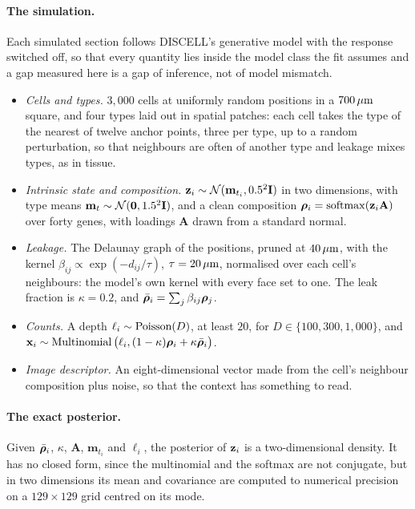 \paragraph{The simulation.}
Each simulated section follows DISCELL's generative model with the response switched off, so that every quantity lies inside the model class the fit assumes and a gap measured here is a gap of inference, not of model mismatch.
\begin{itemize}
\item \emph{Cells and types.} $3{,}000$ cells at uniformly random positions in a $700\,\mu\text{m}$ square, and four types laid out in spatial patches: each cell takes the type of the nearest of twelve anchor points, three per type, up to a random perturbation, so that neighbours are often of another type and leakage mixes types, as in tissue.
\item \emph{Intrinsic state and composition.} $\mathbf{z}_i \sim \mathcal{N}(\mathbf{m}_{t_i}, 0.5^2\mathbf{I})$ in two dimensions, with type means $\mathbf{m}_t \sim \mathcal{N}(\mathbf{0}, 1.5^2\mathbf{I})$, and a clean composition $\boldsymbol{\rho}_i = \operatorname{softmax}(\mathbf{z}_i\mathbf{A})$ over forty genes, with loadings $\mathbf{A}$ drawn from a standard normal.
\item \emph{Leakage.} The Delaunay graph of the positions, pruned at $40\,\mu\text{m}$, with the kernel $\beta_{ij} \propto \exp(-d_{ij}/\tau)$, $\tau = 20\,\mu\text{m}$, normalised over each cell's neighbours: the model's own kernel with every face set to one. The leak fraction is $\kappa = 0.2$, and $\bar{\boldsymbol{\rho}}_i = \sum_j \beta_{ij}\boldsymbol{\rho}_j$.
\item \emph{Counts.} A depth $\ell_i \sim \operatorname{Poisson}(D)$, at least $20$, for $D \in \{100, 300, 1{,}000\}$, and $\mathbf{x}_i \sim \operatorname{Multinomial}\big(\ell_i, (1-\kappa)\boldsymbol{\rho}_i + \kappa\bar{\boldsymbol{\rho}}_i\big)$.
\item \emph{Image descriptor.} An eight-dimensional vector made from the cell's neighbour composition plus noise, so that the context has something to read.
\end{itemize}

\paragraph{The exact posterior.}
Given $\bar{\boldsymbol{\rho}}_i$, $\kappa$, $\mathbf{A}$, $\mathbf{m}_{t_i}$ and $\ell_i$, the posterior of $\mathbf{z}_i$ is a two-dimensional density. It has no closed form, since the multinomial and the softmax are not conjugate, but in two dimensions its mean and covariance are computed to numerical precision on a $129 \times 129$ grid centred on its mode.

